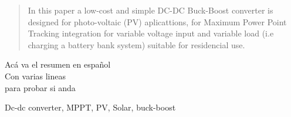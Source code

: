 \begin{abstract}


    In this paper a low-cost and simple DC-DC Buck-Boost converter is designed for photo-voltaic (PV) aplicattions, for Maximum Power Point Tracking integration for variable voltage input and variable load (i.e charging a battery bank system) suitable for residencial use. 
    

\end{abstract}
\begin{resumen}
    Acá va el resumen en español \\ 
    Con varias lineas \\ 
    para probar si anda \\ 
    
\end{resumen}

\begin{IEEEkeywords}
   Dc-dc converter, MPPT, PV, Solar, buck-boost
\end{IEEEkeywords}